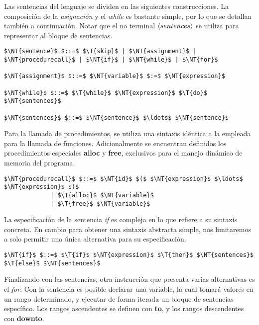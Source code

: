 Las sentencias del lenguaje se dividen en las siguientes construcciones.
La composición de la \textit{asignación} y el \textit{while} es bastante simple, por lo que se detallan también a continuación.
Notar que el no terminal $\langle sentences \rangle$ se utiliza para representar al bloque de sentencias.

\begin{lstlisting}[style = syntax]
$\NT{sentence}$ $::=$ $\T{skip}$ | $\NT{assignment}$ | $\NT{procedurecall}$ | $\NT{if}$ | $\NT{while}$ | $\NT{for}$

$\NT{assignment}$ $::=$ $\NT{variable}$ $:=$ $\NT{expression}$

$\NT{while}$ $::=$ $\T{while}$ $\NT{expression}$ $\T{do}$ $\NT{sentences}$

$\NT{sentences}$ $::=$ $\NT{sentence}$ $\ldots$ $\NT{sentence}$
\end{lstlisting}

Para la llamada de procedimientos, se utiliza una sintaxis idéntica a la empleada para la llamada de funciones.
Adicionalmente se encuentran definidos los procedimientos especiales \textbf{alloc} y \textbf{free}, exclusivos para el manejo dinámico de memoria del programa.

\begin{lstlisting}[style = syntax]
$\NT{procedurecall}$ $::=$ $\NT{id}$ $($ $\NT{expression}$ $\ldots$ $\NT{expression}$ $)$
             | $\T{alloc}$ $\NT{variable}$
             | $\T{free}$ $\NT{variable}$
\end{lstlisting}

La especificación de la sentencia \textit{if} es compleja en lo que refiere a su sintaxis concreta.
En cambio para obtener una sintaxis abstracta simple, nos limitaremos a solo permitir una única alternativa para su especificación.

\begin{lstlisting}[style = syntax]
$\NT{if}$ $::=$ $\T{if}$ $\NT{expression}$ $\T{then}$ $\NT{sentences}$ $\T{else}$ $\NT{sentences}$
\end{lstlisting}

Finalizando con las sentencias, otra instrucción que presenta varias alternativas es el \textit{for}.
Con la sentencia es posible declarar una variable, la cual tomará valores en un rango determinado, y ejecutar de forma iterada un bloque de sentencias específico.
Los rangos ascendentes se definen con \textbf{to}, y los rangos descendentes con \textbf{downto}.

